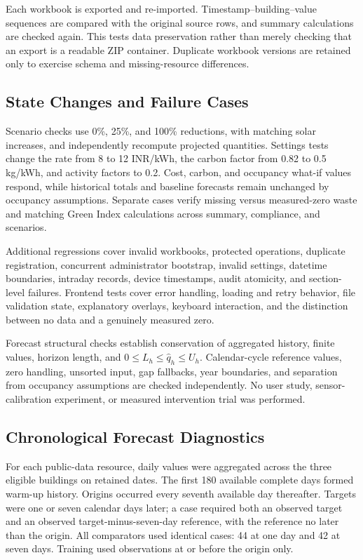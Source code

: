 \documentclass[conference]{IEEEtran}
\begin{document}
Each workbook is exported and re-imported. Timestamp--building--value sequences are compared with the original source rows, and summary calculations are checked again. This tests data preservation rather than merely checking that an export is a readable ZIP container. Duplicate workbook versions are retained only to exercise schema and missing-resource differences.

\subsection{State Changes and Failure Cases}
Scenario checks use 0\%, 25\%, and 100\% reductions, with matching solar increases, and independently recompute projected quantities. Settings tests change the rate from 8 to 12 INR/kWh, the carbon factor from 0.82 to 0.5 kg/kWh, and activity factors to 0.2. Cost, carbon, and occupancy what-if values respond, while historical totals and baseline forecasts remain unchanged by occupancy assumptions. Separate cases verify missing versus measured-zero waste and matching Green Index calculations across summary, compliance, and scenarios.

Additional regressions cover invalid workbooks, protected operations, duplicate registration, concurrent administrator bootstrap, invalid settings, datetime boundaries, intraday records, device timestamps, audit atomicity, and section-level failures. Frontend tests cover error handling, loading and retry behavior, file validation state, explanatory overlays, keyboard interaction, and the distinction between no data and a genuinely measured zero.

Forecast structural checks establish conservation of aggregated history, finite values, horizon length, and $0\leq L_h\leq\widehat q_h\leq U_h$. Calendar-cycle reference values, zero handling, unsorted input, gap fallbacks, year boundaries, and separation from occupancy assumptions are checked independently. No user study, sensor-calibration experiment, or measured intervention trial was performed.

\subsection{Chronological Forecast Diagnostics}
For each public-data resource, daily values were aggregated across the three eligible buildings on retained dates. The first 180 available complete days formed warm-up history. Origins occurred every seventh available day thereafter. Targets were one or seven calendar days later; a case required both an observed target and an observed target-minus-seven-day reference, with the reference no later than the origin. All comparators used identical cases: 44 at one day and 42 at seven days. Training used observations at or before the origin only.
\end{document}
